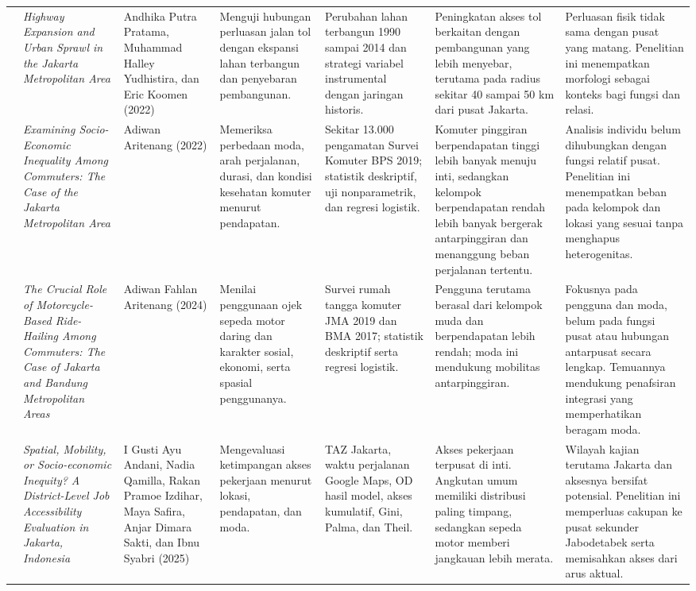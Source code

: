 \documentclass[12pt,a4paper,oneside,openany,indonesian]{report}
\begin{document}
\begin{landscape}
\begin{longtable}{>{\centering\arraybackslash}p{0.55cm}p{3.4cm}p{3.0cm}p{3.6cm}p{3.9cm}p{4.0cm}p{4.5cm}}
7 & \textit{Highway Expansion and Urban Sprawl in the Jakarta Metropolitan Area} & Andhika Putra Pratama, Muhammad Halley Yudhistira, dan Eric Koomen (2022) & Menguji hubungan perluasan jalan tol dengan ekspansi lahan terbangun dan penyebaran pembangunan. & Perubahan lahan terbangun 1990 sampai 2014 dan strategi variabel instrumental dengan jaringan historis. & Peningkatan akses tol berkaitan dengan pembangunan yang lebih menyebar, terutama pada radius sekitar 40 sampai 50 km dari pusat Jakarta. & Perluasan fisik tidak sama dengan pusat yang matang. Penelitian ini menempatkan morfologi sebagai konteks bagi fungsi dan relasi.\\
8 & \textit{Examining Socio-Economic Inequality Among Commuters: The Case of the Jakarta Metropolitan Area} & Adiwan Aritenang (2022) & Memeriksa perbedaan moda, arah perjalanan, durasi, dan kondisi kesehatan komuter menurut pendapatan. & Sekitar 13.000 pengamatan Survei Komuter BPS 2019; statistik deskriptif, uji nonparametrik, dan regresi logistik. & Komuter pinggiran berpendapatan tinggi lebih banyak menuju inti, sedangkan kelompok berpendapatan rendah lebih banyak bergerak antarpinggiran dan menanggung beban perjalanan tertentu. & Analisis individu belum dihubungkan dengan fungsi relatif pusat. Penelitian ini menempatkan beban pada kelompok dan lokasi yang sesuai tanpa menghapus heterogenitas.\\
9 & \textit{The Crucial Role of Motorcycle-Based Ride-Hailing Among Commuters: The Case of Jakarta and Bandung Metropolitan Areas} & Adiwan Fahlan Aritenang (2024) & Menilai penggunaan ojek sepeda motor daring dan karakter sosial, ekonomi, serta spasial penggunanya. & Survei rumah tangga komuter JMA 2019 dan BMA 2017; statistik deskriptif serta regresi logistik. & Pengguna terutama berasal dari kelompok muda dan berpendapatan lebih rendah; moda ini mendukung mobilitas antarpinggiran. & Fokusnya pada pengguna dan moda, belum pada fungsi pusat atau hubungan antarpusat secara lengkap. Temuannya mendukung penafsiran integrasi yang memperhatikan beragam moda.\\
10 & \textit{Spatial, Mobility, or Socio-economic Inequity? A District-Level Job Accessibility Evaluation in Jakarta, Indonesia} & I Gusti Ayu Andani, Nadia Qamilla, Rakan Pramoe Izdihar, Maya Safira, Anjar Dimara Sakti, dan Ibnu Syabri (2025) & Mengevaluasi ketimpangan akses pekerjaan menurut lokasi, pendapatan, dan moda. & TAZ Jakarta, waktu perjalanan Google Maps, OD hasil model, akses kumulatif, Gini, Palma, dan Theil. & Akses pekerjaan terpusat di inti. Angkutan umum memiliki distribusi paling timpang, sedangkan sepeda motor memberi jangkauan lebih merata. & Wilayah kajian terutama Jakarta dan aksesnya bersifat potensial. Penelitian ini memperluas cakupan ke pusat sekunder Jabodetabek serta memisahkan akses dari arus aktual.\\

\end{longtable}
\end{landscape}
\end{document}
